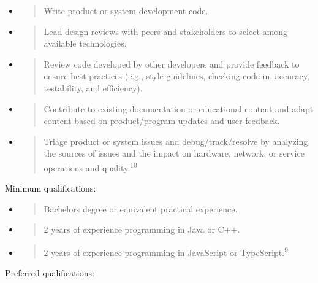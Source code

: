 \documentclass[12pt,a4paper]{article}
\begin{document}
\begin{itemize}
\item
  \begin{quote}
  Write product or system development code.
  \end{quote}
\item
  \begin{quote}
  Lead design reviews with peers and stakeholders to select among available technologies.
  \end{quote}
\item
  \begin{quote}
  Review code developed by other developers and provide feedback to ensure best practices (e.g., style guidelines, checking code in, accuracy, testability, and efficiency).
  \end{quote}
\item
  \begin{quote}
  Contribute to existing documentation or educational content and adapt content based on product/program updates and user feedback.
  \end{quote}
\item
  \begin{quote}
  Triage product or system issues and debug/track/resolve by analyzing the sources of issues and the impact on hardware, network, or service operations and quality.\textsuperscript{10}
  \end{quote}
\end{itemize}

Minimum qualifications:

\begin{itemize}
\item
  \begin{quote}
  Bachelor\textquotesingle s degree or equivalent practical experience.
  \end{quote}
\item
  \begin{quote}
  2 years of experience programming in Java or C++.
  \end{quote}
\item
  \begin{quote}
  2 years of experience programming in JavaScript or TypeScript.\textsuperscript{9}
  \end{quote}
\end{itemize}

Preferred qualifications:
\end{document}
